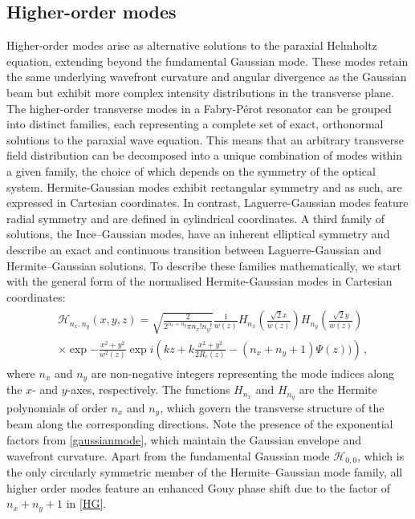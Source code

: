 \documentclass[../Thesis-IJspeert.tex]{subfiles}
\begin{document}
\subsection{Higher-order modes}
\label{higerordermodesection}
Higher-order modes arise as alternative solutions to the paraxial Helmholtz equation, extending beyond the fundamental Gaussian mode. These modes retain the same underlying wavefront curvature and angular divergence as the Gaussian beam but exhibit more complex intensity distributions in the transverse plane. The higher-order transverse modes in a Fabry-Pérot resonator can be grouped into distinct families, each representing a complete set of exact, orthonormal solutions to the paraxial wave equation. This means that an arbitrary transverse field distribution can be decomposed into a unique combination of modes within a given family, the choice of which depends on the symmetry of the optical system. Hermite-Gaussian modes exhibit rectangular symmetry and as such, are expressed in Cartesian coordinates. In contrast, Laguerre-Gaussian modes feature radial symmetry and are defined in cylindrical coordinates. A third family of solutions, the Ince–Gaussian modes, have an inherent elliptical symmetry and describe an exact and continuous transition between Laguerre-Gaussian and Hermite–Gaussian solutions. To describe these families mathematically, we start with the general form of the normalised Hermite-Gaussian modes in Cartesian coordinates:
\begin{align}
\label{HG}
\begin{split}
&\mathcal{H}_{n_x,n_y}(x, y, z) = \sqrt{\frac{2}{ 2^{n_x+n_y} \pi n_x!n_y!}} \frac{1}{w(z)}H_{n_x}\left(\frac{\sqrt{2}x}{w(z)}\right) H_{n_y}\left(\frac{\sqrt{2}y}{w(z)}\right)\\ &\times\exp{-\frac{x^2 + y^2}{w^2(z)}} \exp{ i\left(kz + k\frac{x^2+y^2}{2R_\mathrm{c}(z)} - (n_x+n_y+1)\Psi(z))\right) } \,,
\end{split}
\end{align}
where $n_x$ and $n_y$ are non-negative integers representing the mode indices along the $x$- and $y$-axes, respectively. The functions $H_{n_x}$ and $H_{n_y}$ are the Hermite polynomials of order $n_x$ and $n_y$, which govern the transverse structure of the beam along the corresponding directions. Note the presence of the exponential factors from \autoref{gaussianmode}, which maintain the Gaussian envelope and wavefront curvature. Apart from the fundamental Gaussian mode $\mathcal{H}_{0,0}$, which is the only circularly symmetric member of the Hermite–Gaussian mode family, all higher order modes feature an enhanced Gouy phase shift due to the factor of $n_x+n_y+1$ in \autoref{HG}.
\end{document}
